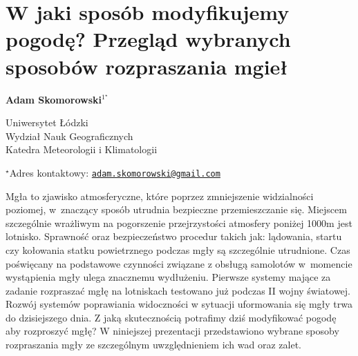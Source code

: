 \documentclass[\main/boa.tex]{subfiles}
\begin{document}
\section{W jaki sposób modyfikujemy pogodę? Przegląd wybranych sposobów rozpraszania mgieł}

\begin{center}
  {\bf {} Adam Skomorowski$^{1^\star}$}
\end{center}

\vskip 0.3cm

\begin{affiliations}
\begin{enumerate}
\begin{minipage}{0.915\textwidth}
\centering
\item Uniwersytet Łódzki \\ Wydział Nauk Geograficznych \\ Katedra Meteorologii i Klimatologii\\[-2pt]
\end{minipage}
\end{enumerate}
$^\star$Adres kontaktowy: \href{mailto:adam.skomorowski@gmail.com}{\nolinkurl{adam.skomorowski@gmail.com}}\\
\end{affiliations}

\vskip 0.5cm


\vskip 0.5cm

Mgła to zjawisko atmosferyczne, które poprzez zmniejszenie widzialności poziomej, w znaczący sposób utrudnia bezpieczne przemieszczanie się. Miejscem szczególnie wrażliwym na pogorszenie przejrzystości atmosfery poniżej 1000m jest lotnisko. Sprawność oraz bezpieczeństwo procedur takich jak: lądowania, startu czy kołowania statku powietrznego podczas mgły są szczególnie utrudnione. Czas poświęcany na podstawowe czynności związane z obsługą samolotów w momencie wystąpienia mgły ulega znacznemu wydłużeniu. Pierwsze systemy mające za zadanie rozpraszać mgłę na lotniskach testowano już podczas II wojny światowej. Rozwój systemów poprawiania widoczności w sytuacji uformowania się mgły trwa do dzisiejszego dnia. Z jaką skutecznością potrafimy dziś modyfikować pogodę aby rozproszyć mgłę? W niniejszej prezentacji przedstawiono wybrane sposoby rozpraszania mgły ze szczególnym uwzględnieniem ich wad oraz zalet.
\end{document}
